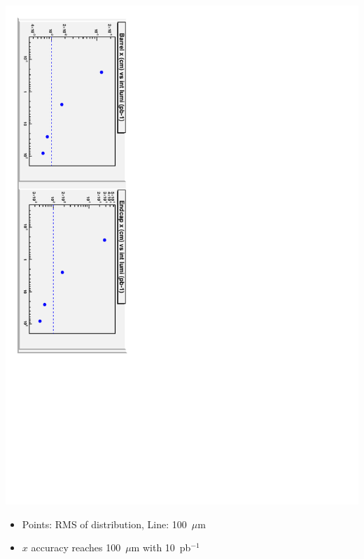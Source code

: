 \documentclass[compress]{beamer}
\begin{document}
\begin{frame}
\includegraphics[height=\linewidth, angle=90]{events_x_wacky.pdf}





\vspace{0.25 cm}
\begin{itemize}\setlength{\itemsep}{0.25 cm}
\item Points: RMS of distribution, Line: 100~$\mu$m
\item $x$ accuracy reaches 100~$\mu$m with 10~pb$^{-1}$
\end{itemize}

\end{frame}
\end{document}
